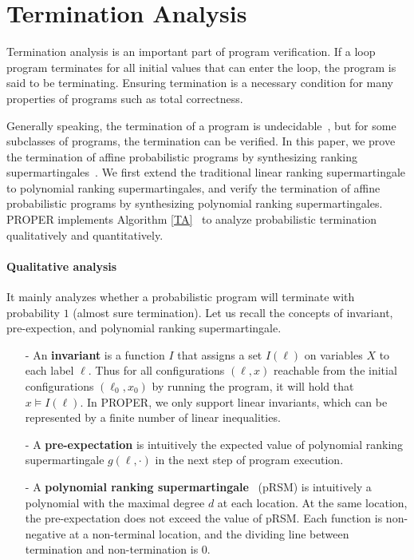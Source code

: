 \documentclass[runningheads]{llncs}
\begin{document}
\section{Termination Analysis}
Termination analysis is an important part of program verification. If a loop program terminates for all initial values that can enter the loop, the program is said to be terminating. Ensuring termination is a necessary condition for many properties of programs such as total correctness. 

Generally speaking, the termination of a program is undecidable~\cite{Turing1936On}, but for some subclasses of programs, the termination can be verified. In this paper, we prove the termination of affine probabilistic programs by synthesizing ranking supermartingales~\cite{Chakarov2013Martingales}. We first extend the traditional linear ranking supermartingale to polynomial ranking supermartingales, and verify the termination of affine probabilistic programs by synthesizing polynomial ranking supermartingales. PROPER implements Algorithm \ref{TA}~\cite{kris2016termination,cha2015algorithmic} to analyze probabilistic termination qualitatively and quantitatively.  

\paragraph{Qualitative analysis} It mainly analyzes whether a probabilistic program will terminate with probability $1$ (almost sure termination).
Let us recall the concepts of invariant, pre-expection, and polynomial ranking supermartingale.
\begin{enumerate}
	\item[-] An \textbf{invariant} is a function $I$ that assigns a set $I(\ell)$ on variables $X$ to each label $\ell$. Thus for all configurations $(\ell,x)$  reachable from the initial configurations $(\ell_0, x_0)$ by running the program, it will hold that $x \vDash I(\ell)$. In PROPER, we only support linear invariants, which can be represented by a finite number of linear inequalities.
	\item[-] A \textbf{pre-expectation} is intuitively the expected value of polynomial ranking  supermartingale $g(\ell,\cdot)$ in the next step of program execution.
	\item[-] A \textbf{polynomial ranking supermartingale}~\cite{Chakarov2013Martingales} (pRSM) is intuitively a polynomial with the maximal degree $d$ at each location. At the same location, the pre-expectation does not exceed the value of pRSM. Each function is non-negative at a non-terminal location, and the dividing line between termination and non-termination is 0.
\end{enumerate}
\end{document}
